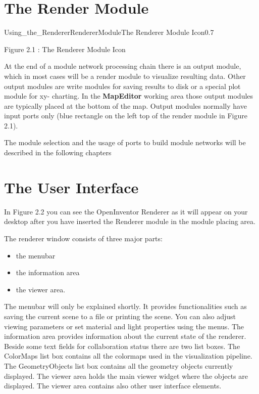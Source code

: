 \section{The Render Module}

\begin{covimg}{Using_the_Renderer}{RendererModule}{The Renderer Module Icon}{0.7}\end{covimg}
\begin{htmlonly}
Figure 2.1 : The Renderer Module Icon
\vspace{0.5cm}
\end{htmlonly}

At the end of a module network processing chain there is an output module, which in most 
cases will be a render module to visualize resulting data. Other output modules are write 
modules for saving results to disk or a special plot module for xy- charting. In the 
{\bf MapEditor} working area those output modules are typically placed at the bottom of the
map. Output modules normally have input ports only (blue rectangle on the left top of the 
render module in Figure 2.1). 

The module selection and the usage of ports to build module networks will be described 
in the following chapters

\section{The User Interface}

In Figure 2.2 you can see the OpenInventor Renderer as it will appear on your desktop 
after you have inserted the Renderer module in the module placing area.

The renderer window consists of three major parts: 

\begin{itemize}
\item the menubar
\item the information area
\item the viewer area.
\end{itemize}

The menubar will only be explained shortly. It provides functionalities such as saving 
the current scene to a file or printing the scene. You can also adjust viewing parameters 
or set material and light properties using the menus. The information area provides 
information about the current state of the renderer. Beside some text fields for 
collaboration status there are two list boxes. The ColorMaps list box contains all the 
colormaps used in the visualization pipeline. The GeometryObjects list box contains all the geometry objects currently displayed. 
The viewer area holds the main viewer widget where the objects are displayed. The viewer 
area contains also other user interface elements.

